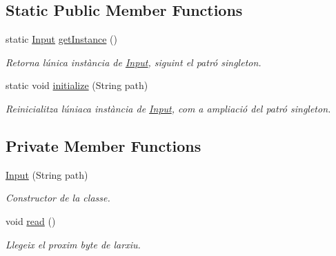 \subsection*{Static Public Member Functions}
\begin{DoxyCompactItemize}
\item 
static \hyperlink{classpersistencia_1_1input_1_1Input}{Input} \hyperlink{classpersistencia_1_1input_1_1Input_aa45459b94e501548a7b223d24b560ad0}{get\+Instance} ()
\begin{DoxyCompactList}\small\item\em Retorna l\textquotesingle{}única instància de \hyperlink{classpersistencia_1_1input_1_1Input}{Input}, siguint el patró singleton. \end{DoxyCompactList}\item 
static void \hyperlink{classpersistencia_1_1input_1_1Input_abe53dec7aca98b94d0ec5e3200483513}{initialize} (String path)
\begin{DoxyCompactList}\small\item\em Reinicialitza l\textquotesingle{}úniaca instància de \hyperlink{classpersistencia_1_1input_1_1Input}{Input}, com a ampliació del patró singleton. \end{DoxyCompactList}\end{DoxyCompactItemize}
\subsection*{Private Member Functions}
\begin{DoxyCompactItemize}
\item 
\hyperlink{classpersistencia_1_1input_1_1Input_a9b30ef8d489a1fc5b4aa04a14474349a}{Input} (String path)
\begin{DoxyCompactList}\small\item\em Constructor de la classe. \end{DoxyCompactList}\item 
void \hyperlink{classpersistencia_1_1input_1_1Input_a24eae4109b4ff4954ff2d7feef2fa4e4}{read} ()
\begin{DoxyCompactList}\small\item\em Llegeix el proxim byte de l\textquotesingle{}arxiu. \end{DoxyCompactList}\end{DoxyCompactItemize}
